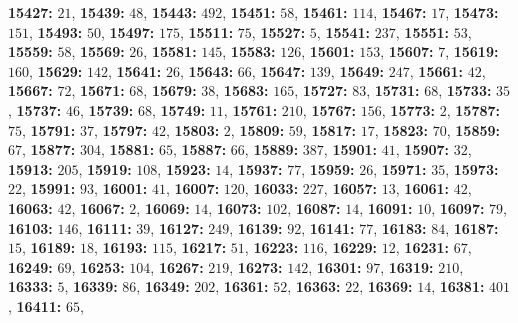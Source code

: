 \textsf{\bfseries 15427:} $21$, \textsf{\bfseries 15439:} $48$, \textsf{\bfseries 15443:} $492$, \textsf{\bfseries 15451:} $58$, \textsf{\bfseries 15461:} $114$, \textsf{\bfseries 15467:} $17$, \textsf{\bfseries 15473:} $151$, \textsf{\bfseries 15493:} $50$, \textsf{\bfseries 15497:} $175$, \textsf{\bfseries 15511:} $75$, \textsf{\bfseries 15527:} $5$, \textsf{\bfseries 15541:} $237$, \textsf{\bfseries 15551:} $53$, \textsf{\bfseries 15559:} $58$, \textsf{\bfseries 15569:} $26$, \textsf{\bfseries 15581:} $145$, \textsf{\bfseries 15583:} $126$, \textsf{\bfseries 15601:} $153$, \textsf{\bfseries 15607:} $7$, \textsf{\bfseries 15619:} $160$, \textsf{\bfseries 15629:} $142$, \textsf{\bfseries 15641:} $26$, \textsf{\bfseries 15643:} $66$, \textsf{\bfseries 15647:} $139$, \textsf{\bfseries 15649:} $247$, \textsf{\bfseries 15661:} $42$, \textsf{\bfseries 15667:} $72$, \textsf{\bfseries 15671:} $68$, \textsf{\bfseries 15679:} $38$, \textsf{\bfseries 15683:} $165$, \textsf{\bfseries 15727:} $83$, \textsf{\bfseries 15731:} $68$, \textsf{\bfseries 15733:} $35$, \textsf{\bfseries 15737:} $46$, \textsf{\bfseries 15739:} $68$, \textsf{\bfseries 15749:} $11$, \textsf{\bfseries 15761:} $210$, \textsf{\bfseries 15767:} $156$, \textsf{\bfseries 15773:} $2$, \textsf{\bfseries 15787:} $75$, \textsf{\bfseries 15791:} $37$, \textsf{\bfseries 15797:} $42$, \textsf{\bfseries 15803:} $2$, \textsf{\bfseries 15809:} $59$, \textsf{\bfseries 15817:} $17$, \textsf{\bfseries 15823:} $70$, \textsf{\bfseries 15859:} $67$, \textsf{\bfseries 15877:} $304$, \textsf{\bfseries 15881:} $65$, \textsf{\bfseries 15887:} $66$, \textsf{\bfseries 15889:} $387$, \textsf{\bfseries 15901:} $41$, \textsf{\bfseries 15907:} $32$, \textsf{\bfseries 15913:} $205$, \textsf{\bfseries 15919:} $108$, \textsf{\bfseries 15923:} $14$, \textsf{\bfseries 15937:} $77$, \textsf{\bfseries 15959:} $26$, \textsf{\bfseries 15971:} $35$, \textsf{\bfseries 15973:} $22$, \textsf{\bfseries 15991:} $93$, \textsf{\bfseries 16001:} $41$, \textsf{\bfseries 16007:} $120$, \textsf{\bfseries 16033:} $227$, \textsf{\bfseries 16057:} $13$, \textsf{\bfseries 16061:} $42$, \textsf{\bfseries 16063:} $42$, \textsf{\bfseries 16067:} $2$, \textsf{\bfseries 16069:} $14$, \textsf{\bfseries 16073:} $102$, \textsf{\bfseries 16087:} $14$, \textsf{\bfseries 16091:} $10$, \textsf{\bfseries 16097:} $79$, \textsf{\bfseries 16103:} $146$, \textsf{\bfseries 16111:} $39$, \textsf{\bfseries 16127:} $249$, \textsf{\bfseries 16139:} $92$, \textsf{\bfseries 16141:} $77$, \textsf{\bfseries 16183:} $84$, \textsf{\bfseries 16187:} $15$, \textsf{\bfseries 16189:} $18$, \textsf{\bfseries 16193:} $115$, \textsf{\bfseries 16217:} $51$, \textsf{\bfseries 16223:} $116$, \textsf{\bfseries 16229:} $12$, \textsf{\bfseries 16231:} $67$, \textsf{\bfseries 16249:} $69$, \textsf{\bfseries 16253:} $104$, \textsf{\bfseries 16267:} $219$, \textsf{\bfseries 16273:} $142$, \textsf{\bfseries 16301:} $97$, \textsf{\bfseries 16319:} $210$, \textsf{\bfseries 16333:} $5$, \textsf{\bfseries 16339:} $86$, \textsf{\bfseries 16349:} $202$, \textsf{\bfseries 16361:} $52$, \textsf{\bfseries 16363:} $22$, \textsf{\bfseries 16369:} $14$, \textsf{\bfseries 16381:} $401$, \textsf{\bfseries 16411:} $65$, 
